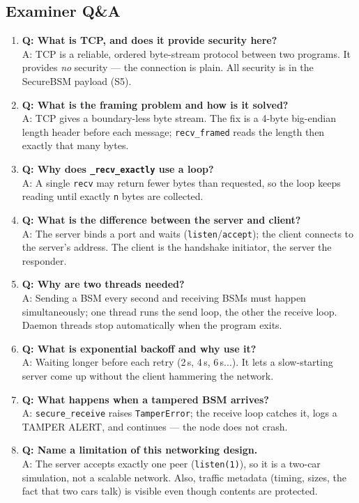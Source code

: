 \documentclass[11pt,a4paper]{report}
\begin{document}
\subsection{Examiner Q\&A}
\begin{enumerate}
  \item \textbf{Q: What is TCP, and does it provide security here?}\\
        A: TCP is a reliable, ordered byte-stream protocol between two programs.
        It provides \emph{no} security --- the connection is plain. All security
        is in the SecureBSM payload (S5).
  \item \textbf{Q: What is the framing problem and how is it solved?}\\
        A: TCP gives a boundary-less byte stream. The fix is a 4-byte big-endian
        length header before each message; \texttt{recv\_framed} reads the length
        then exactly that many bytes.
  \item \textbf{Q: Why does \texttt{\_recv\_exactly} use a loop?}\\
        A: A single \texttt{recv} may return fewer bytes than requested, so the
        loop keeps reading until exactly \texttt{n} bytes are collected.
  \item \textbf{Q: What is the difference between the server and client?}\\
        A: The server binds a port and waits (\texttt{listen}/\texttt{accept});
        the client connects to the server's address. The client is the handshake
        initiator, the server the responder.
  \item \textbf{Q: Why are two threads needed?}\\
        A: Sending a BSM every second and receiving BSMs must happen
        simultaneously; one thread runs the send loop, the other the receive
        loop. Daemon threads stop automatically when the program exits.
  \item \textbf{Q: What is exponential backoff and why use it?}\\
        A: Waiting longer before each retry (2\,s, 4\,s, 6\,s...). It lets a
        slow-starting server come up without the client hammering the network.
  \item \textbf{Q: What happens when a tampered BSM arrives?}\\
        A: \texttt{secure\_receive} raises \texttt{TamperError}; the receive loop
        catches it, logs a TAMPER ALERT, and continues --- the node does not crash.
  \item \textbf{Q: Name a limitation of this networking design.}\\
        A: The server accepts exactly one peer (\texttt{listen(1)}), so it is a
        two-car simulation, not a scalable network. Also, traffic metadata
        (timing, sizes, the fact that two cars talk) is visible even though
        contents are protected.
\end{enumerate}
\end{document}
